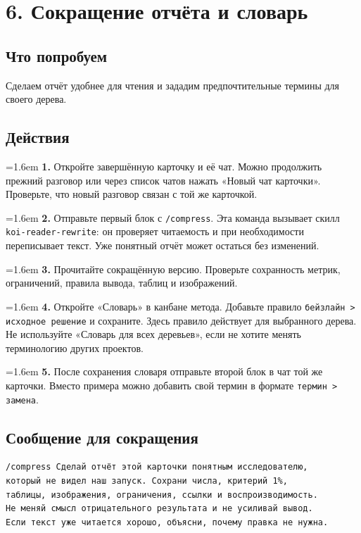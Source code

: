 \documentclass[10pt,a4paper]{article}
\begin{document}
\clearpage
\section{6. Сокращение отчёта и словарь}
\subsection*{Что попробуем}
Сделаем отчёт удобнее для чтения и зададим предпочтительные термины для своего дерева.

\subsection*{Действия}
\par\noindent\hangindent=1.6em \textbf{1.} Откройте завершённую карточку и её чат. Можно продолжить прежний разговор или через список чатов нажать «Новый чат карточки». Проверьте, что новый разговор связан с той же карточкой.\par
\par\noindent\hangindent=1.6em \textbf{2.} Отправьте первый блок с \texttt{/compress}. Эта команда вызывает скилл \texttt{koi-\allowbreak{}reader-\allowbreak{}rewrite}: он проверяет читаемость и при необходимости переписывает текст. Уже понятный отчёт может остаться без изменений.\par
\par\noindent\hangindent=1.6em \textbf{3.} Прочитайте сокращённую версию. Проверьте сохранность метрик, ограничений, правила вывода, таблиц и изображений.\par
\par\noindent\hangindent=1.6em \textbf{4.} Откройте «Словарь» в канбане метода. Добавьте правило \texttt{бейзлайн > исходное решение} и сохраните. Здесь правило действует для выбранного дерева. Не используйте «Словарь для всех деревьев», если не хотите менять терминологию других проектов.\par
\par\noindent\hangindent=1.6em \textbf{5.} После сохранения словаря отправьте второй блок в чат той же карточки. Вместо примера можно добавить свой термин в формате \texttt{термин > замена}.\par
\subsection*{Сообщение для сокращения}
\begin{promptbox}
\begin{Verbatim}
/compress Сделай отчёт этой карточки понятным исследователю,
который не видел наш запуск. Сохрани числа, критерий 1%,
таблицы, изображения, ограничения, ссылки и воспроизводимость.
Не меняй смысл отрицательного результата и не усиливай вывод.
Если текст уже читается хорошо, объясни, почему правка не нужна.
\end{Verbatim}
\end{promptbox}
\end{document}
